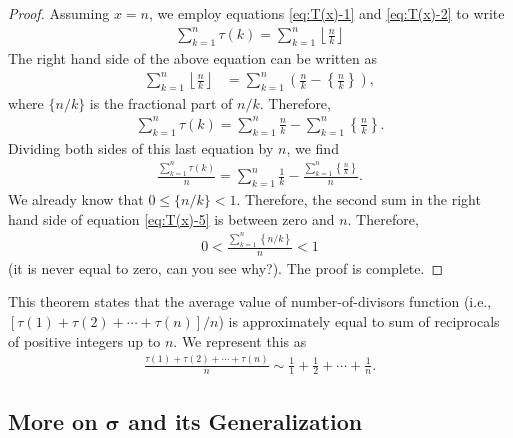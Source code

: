 \documentclass[12pt]{subfile}
\begin{document}
	\begin{proof}
		Assuming $x=n$, we employ equations \eqref{eq:T(x)-1} and \eqref{eq:T(x)-2} to write
			\begin{align*}
				\sum_{k=1}^{n} \tau(k) = \sum_{k=1}^{n} \left\lfloor \frac{n}{k} \right\rfloor
			\end{align*}
		The right hand side of the above equation can be written as
			\begin{align*}
				\sum_{k=1}^{n} \left\lfloor \frac{n}{k} \right\rfloor &= \sum_{k=1}^{n} \left(\frac{n}{k} - \left\{ \frac{n}{k} \right\}\right),
			\end{align*}
		where $\{n/k\}$ is the fractional part of $n/k$. Therefore,
			\begin{align}
				\sum_{k=1}^{n} \tau(k) = \sum_{k=1}^{n} \frac{n}{k}  - \sum_{k=1}^{n} \left\{ \frac{n}{k} \right\}. \label{eq:T(x)-5}
			\end{align}
		Dividing both sides of this last equation by $n$, we find
			\begin{align}
			\frac{\sum\limits_{k=1}^{n} \tau(k)}{n} = \sum_{k=1}^{n} \frac{1}{k}  - \frac{\sum\limits_{k=1}^{n} \left\{ \frac{n}{k} \right\}}{n}.
			\end{align}
		We already know that $0 \leq \{n/k\}<1$. Therefore, the second sum in the right hand side of equation \eqref{eq:T(x)-5} is between zero and $n$. Therefore,
			\begin{align*}
				0 < \frac{\sum_{k=1}^{n} \left\{ n/k \right\}}{n} < 1
			\end{align*}
		(it is never equal to zero, can you see why?). The proof is complete.
	\end{proof}

	\begin{note}
		This theorem states that the average value of number-of-divisors function (i.e., $[\tau(1) +‌\tau(2) + \cdots + \tau(n)]/n$) is approximately equal to sum of reciprocals of positive integers up to $n$. We represent this as
			\begin{align*}
				\frac{\tau(1) + \tau(2) + \cdots + \tau(n)}{n} \sim \frac{1}{1} + \frac{1}{2} + \cdots + \frac{1}{n}.
			\end{align*}
	\end{note}


\subsection{More on \texorpdfstring{$\boldsymbol{\sigma}$}{\textsigma(n)} and its Generalization}
\end{document}
